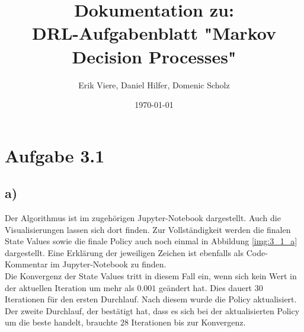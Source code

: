 \documentclass[11pt]{article}
\title{\textbf{Dokumentation zu:\\DRL-Aufgabenblatt "Markov Decision Processes"}}
\author{Erik Viere, Daniel Hilfer, Domenic Scholz}
\date{\today}
\begin{document}
\maketitle	
\pagebreak

\section*{Aufgabe 3.1}
\subsection*{a)}
Der Algorithmus ist im zugehörigen Jupyter-Notebook dargestellt. Auch die Visualisierungen lassen sich dort finden. Zur Vollständigkeit werden die finalen State Values sowie die finale Policy auch noch einmal in Abbildung  \ref{img:3_1_a} dargestellt. Eine Erklärung der jeweiligen Zeichen ist ebenfalls als Code-Kommentar im Jupyter-Notebook zu finden.\\
Die Konvergenz der State Values tritt in diesem Fall ein, wenn sich kein Wert in der aktuellen Iteration um mehr als $0.001$ geändert hat. Dies dauert $30$ Iterationen für den ersten Durchlauf. Nach diesem wurde die Policy aktualisiert. Der zweite Durchlauf, der bestätigt hat, dass es sich bei der aktualisierten Policy um die beste handelt, brauchte $28$ Iterationen bis zur Konvergenz.
\end{document}
